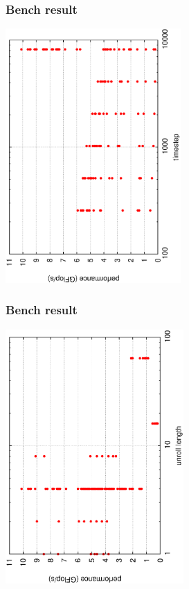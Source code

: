\documentclass[dvipdfmx,cjk]{beamer}
\begin{document}
\begin{frame}[fragile]\frametitle{Bench result}
\begin{center}
\includegraphics[height=9.7cm,angle=270]{figure/bench_timestep.eps}
\end{center}
\end{frame}
\begin{frame}[fragile]\frametitle{Bench result}
\begin{center}
\includegraphics[height=9.7cm,angle=270]{figure/bench_ulen.eps}
\end{center}
\end{frame}
\end{document}
